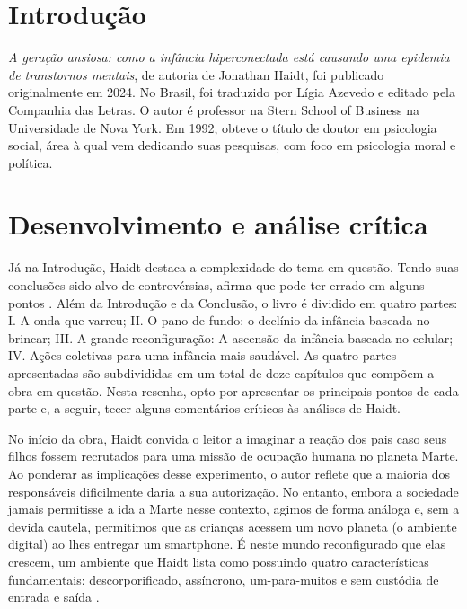 \documentclass[portuguese]{textolivre}
\begin{document}
\section{Introdução}\label{sec-intro}
\textit{A geração ansiosa: como a infância hiperconectada está causando uma epidemia de transtornos mentais}, de autoria de Jonathan Haidt, foi publicado originalmente em 2024. No Brasil, foi traduzido por Lígia Azevedo e editado pela Companhia das Letras. O autor é professor na Stern School of Business na Universidade de Nova York. Em 1992, obteve o título de doutor em psicologia social, área à qual vem dedicando suas pesquisas, com foco em psicologia moral e política.

\vspace{-2pt}
\section{Desenvolvimento e análise crítica}\label{sec-normas}
Já na Introdução, Haidt destaca a complexidade do tema em questão. Tendo suas conclusões sido alvo de controvérsias, afirma que pode ter errado em alguns pontos \cite[p. 25]{haidt2024geracao}. Além da Introdução e da Conclusão, o livro é dividido em quatro partes: I. A onda que varreu; II. O pano de fundo: o declínio da infância baseada no brincar; III. A grande reconfiguração: A ascensão da infância baseada no celular; IV. Ações coletivas para uma infância mais saudável. As quatro partes apresentadas são subdivididas em um total de doze capítulos que compõem a obra em questão. Nesta resenha, opto por apresentar os principais pontos de cada parte e, a seguir, tecer alguns comentários críticos às análises de Haidt.

No início da obra, Haidt convida o leitor a imaginar a reação dos pais caso seus filhos fossem recrutados para uma missão de ocupação humana no planeta Marte. Ao ponderar as implicações desse experimento, o autor reflete que a maioria dos responsáveis dificilmente daria a sua autorização. No entanto, embora a sociedade jamais permitisse a ida a Marte nesse contexto, agimos de forma análoga e, sem a devida cautela, permitimos que as crianças acessem um novo planeta (o ambiente digital) ao lhes entregar um smartphone. É neste mundo reconfigurado que elas crescem, um ambiente que Haidt lista como possuindo quatro características fundamentais: descorporificado, assíncrono, um-para-muitos e sem custódia de entrada e saída \cite[p. 18-19]{haidt2024geracao}.
\end{document}
